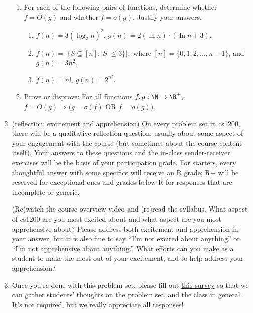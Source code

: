 \documentclass[11pt]{article}
\begin{document}
\begin{enumerate}
\begin{enumerate}
    \item For each of the following pairs of functions, determine whether $f=O(g)$ and whether $f=o(g)$.  Justify your answers.
    \begin{enumerate}
        \item $f(n) = 3(\log_2 n)^2$, $g(n) = 2(\ln n)\cdot (\ln n+3)$. 
        
        
        \solution{
        }
        
        \item $f(n) = \left| \{S \subseteq [n] : |S|\leq 3\}\right|,$ where $[n]=\{0,1,2,\ldots,n-1\}$, and $g(n)=3n^2$.
        

        \solution{
        }

        \item $f(n) = n!$, $g(n)=2^{n^2}$.


        \solution{
        }

    \end{enumerate}

    \item Prove or disprove: For all functions $f,g : \N\rightarrow \R^+,$ $f=O(g) \Rightarrow \big(g= o(f)$ OR $f=o(g)\big)$.
    

    \solution{
    }

\end{enumerate}

\item (reflection: excitement and apprehension) On every problem set in cs1200, there will be a qualitative reflection question, usually about some aspect of your engagement with the course (but sometimes about the course content itself). Your answers to these questions and the in-class sender-receiver exercises will be the basis of your participation grade.  For starters, every thoughtful answer with some specifics will receive an R grade; R+ will be reserved for exceptional ones and grades below R for responses that are incomplete or generic.

(Re)watch the course overview video and (re)read the syllabus.  What aspect of cs1200 are you most excited about and what aspect are you most apprehensive about? Please address both excitement and apprehension in your answer, but it is also fine to say “I’m not excited about anything” or “I’m not apprehensive about anything.” What efforts can you make as a student to make the most out of your excitement, and to help address your apprehension?


\item Once you're done with this problem set, please fill out \href{https://forms.gle/WKKxEMEWoB5hLM7H7}{this survey} so that we can gather students' thoughts on the problem set, and the class in general. It's not required, but we really appreciate all responses!
\end{enumerate}
\end{document}
